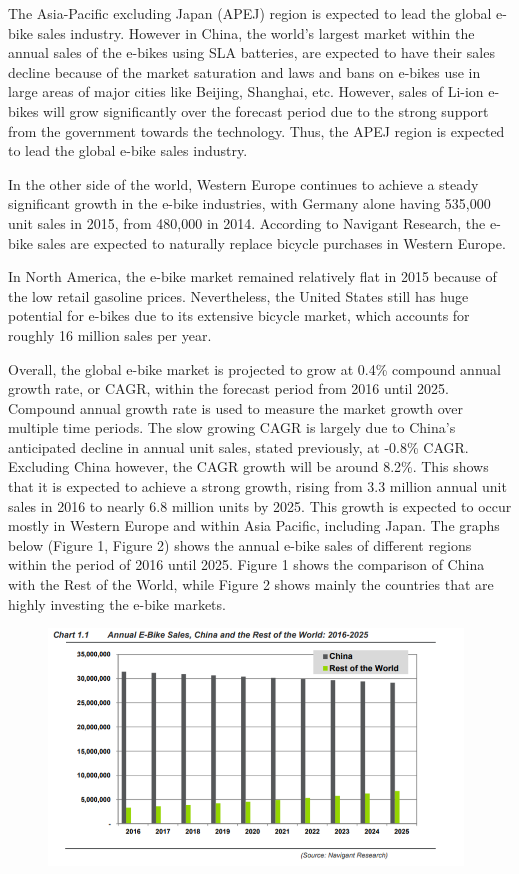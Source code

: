 \documentclass[a4paper,11pt]{article}
\begin{document}
The Asia-Pacific excluding Japan (APEJ) region is expected to lead the global e-bike sales industry. However in China, the world's largest market within the annual sales of the e-bikes using SLA batteries, are expected to have their sales decline because of the market saturation and laws and bans on e-bikes use in large areas of major cities like Beijing, Shanghai, etc. However, sales of Li-ion e-bikes will grow significantly over the forecast period due to the strong support from the government towards the technology. Thus, the APEJ region is expected to lead the global e-bike sales industry.

In the other side of the world, Western Europe continues to achieve a steady significant growth in the e-bike industries, with Germany alone having 535,000 unit sales in 2015, from 480,000 in 2014. According to Navigant Research, the e-bike sales are expected to naturally replace bicycle purchases in Western Europe.

In North America, the e-bike market remained relatively flat in 2015 because of the low retail gasoline prices. Nevertheless, the United States still has huge potential for e-bikes due to its extensive bicycle market, which accounts for roughly 16 million sales per year.

Overall, the global e-bike market is projected to grow at 0.4\% compound annual growth rate, or CAGR, within the forecast period from 2016 until 2025. Compound annual growth rate is used to measure the market growth over multiple time periods. The slow growing CAGR is largely due to China's anticipated decline in annual unit sales, stated previously, at -0.8\% CAGR. Excluding China however, the CAGR growth will be around 8.2\%. This shows that it is expected to achieve a strong growth, rising from 3.3 million annual unit sales in 2016 to nearly 6.8 million units by 2025. This growth is expected to occur mostly in Western Europe and within Asia Pacific, including Japan. The graphs below (Figure 1, Figure 2) shows the annual e-bike sales of different regions within the period of 2016 until 2025. Figure 1 shows the comparison of China with the Rest of the World, while Figure 2 shows mainly the countries that are highly investing the e-bike markets.

\begin{figure}[!ht]
	\centering
	\includegraphics[width=0.98\textwidth]{ebsale}
\end{figure}
\end{document}
